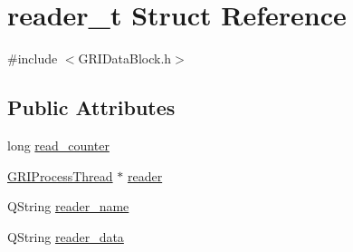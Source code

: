 \hypertarget{structreader__t}{\section{reader\-\_\-t \-Struct \-Reference}
\label{structreader__t}
}


{\ttfamily \#include $<$\-G\-R\-I\-Data\-Block.\-h$>$}

\subsection*{\-Public \-Attributes}
\begin{DoxyCompactItemize}
\item 
long \hyperlink{structreader__t_a8c3485927676e8777fa189468d4e4744}{read\-\_\-counter}
\item 
\hyperlink{classGRIProcessThread}{\-G\-R\-I\-Process\-Thread} $\ast$ \hyperlink{structreader__t_aa62b3e0e8c6abef0b0b397abbe073192}{reader}
\item 
\-Q\-String \hyperlink{structreader__t_a16d6d71e8e9b9f8c61a1403d126232be}{reader\-\_\-name}
\item 
\-Q\-String \hyperlink{structreader__t_a703118e9269c61384e523c7c4fa89303}{reader\-\_\-data}
\end{DoxyCompactItemize}


